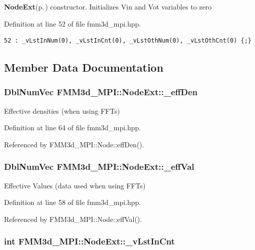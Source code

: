 {\bf Node\-Ext}{\rm (p.\,\pageref{classFMM3d__MPI_1_1NodeExt})} constructor. Initializes Vin and Vot variables to zero 

Definition at line 52 of file fmm3d\_\-mpi.hpp.

\footnotesize\begin{verbatim}52 : _vLstInNum(0), _vLstInCnt(0), _vLstOthNum(0), _vLstOthCnt(0) {;}
\end{verbatim}\normalsize 




\subsection{Member Data Documentation}
\subsubsection{\setlength{\rightskip}{0pt plus 5cm}Dbl\-Num\-Vec {\bf FMM3d\_\-MPI::Node\-Ext::\_\-eff\-Den}}\label{classFMM3d__MPI_1_1NodeExt_64b4391d323e2e6420f187c1fbd3182f_64b4391d323e2e6420f187c1fbd3182f}


Effective densities (when using FFTs) 

Definition at line 64 of file fmm3d\_\-mpi.hpp.

Referenced by FMM3d\_\-MPI::Node::eff\-Den().
\subsubsection{\setlength{\rightskip}{0pt plus 5cm}Dbl\-Num\-Vec {\bf FMM3d\_\-MPI::Node\-Ext::\_\-eff\-Val}}\label{classFMM3d__MPI_1_1NodeExt_97a5333b1cb85d6a8bf1f48ee30ee513_97a5333b1cb85d6a8bf1f48ee30ee513}


Effective Values (data used when using FFTs) 

Definition at line 58 of file fmm3d\_\-mpi.hpp.

Referenced by FMM3d\_\-MPI::Node::eff\-Val().
\subsubsection{\setlength{\rightskip}{0pt plus 5cm}int {\bf FMM3d\_\-MPI::Node\-Ext::\_\-v\-Lst\-In\-Cnt}}\label{classFMM3d__MPI_1_1NodeExt_b5044d3bf3d47e6de0e61d052f46482e_b5044d3bf3d47e6de0e61d052f46482e}



